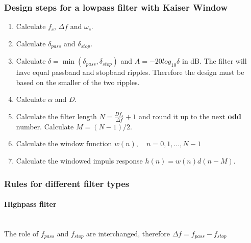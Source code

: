 \subsubsection{Design steps for a lowpass filter with Kaiser Window}
\begin{enumerate}
\item Calculate $f_c$, $\Delta f$ and $\omega_c$.
\item Calculate $\delta_{pass}$ and $\delta_{stop}$.
\item Calculate $\delta=\min(\delta_{pass},\delta_{stop})$ and $A=-20log_{10}\delta$ in dB. \newline
	  The filter will have equal passband and stopband ripples. Therefore the design must be based on the smaller of the two ripples.
\item Calculate $\alpha$ and $D$.
\item Calculate the filter length $N=\frac{Df_s}{\Delta f}+1$ and round it up to the next \textbf{odd} number. Calculate $M=(N-1)/2$.
\item Calculate the window function $w(n),\quad n=0,1,\dots,N-1$
\item Calculate the windowed impuls response $h(n)=w(n)d(n-M)$.
\end{enumerate}

\subsubsection{Rules for different filter types}
\paragraph{Highpass filter}~\\
The role of $f_{pass}$ and $f_{stop}$ are interchanged, therefore $\Delta f = f_{pass}-f_{stop}$

